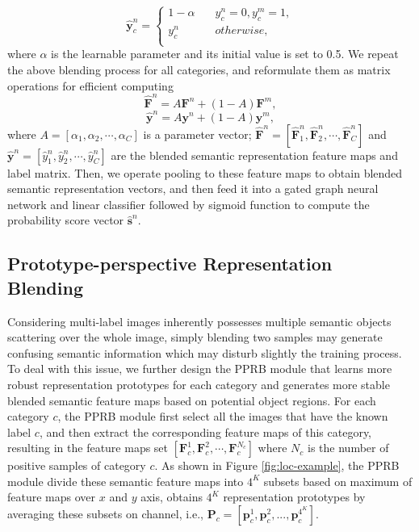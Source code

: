 \documentclass[lettersize,journal]{IEEEtran}
\begin{document}
\begin{equation}
 \hat{\textbf{y}}^{n}_c=
  \begin{cases}
   1 - \alpha \quad & y^n_c=0, y^m_c=1, \\
   y^{n}_c \quad & otherwise,\\
  \end{cases}
\end{equation}
where $\alpha$ is the learnable parameter and its initial value is set to 0.5. We repeat the above blending process for all categories, and reformulate them as matrix operations for efficient computing 
\begin{equation}
 {\hat{\textbf{F}}^{n}} = A \textbf{F}^{n} + (1-A) \textbf{F}^{m},
 \end{equation}
\begin{equation}
 {\hat{\textbf{y}}^{n}} = A \textbf{y}^n + (1-A) \textbf{y}^m,
\end{equation}
where $A=[\alpha_1, \alpha_2, \cdots, \alpha_C]$ is a parameter vector; $\hat{\textbf{F}}^{n}=[\hat{\textbf{F}}^{n}_1, \hat{\textbf{F}}^{n}_2, \cdots, \hat{\textbf{F}}^{n}_C]$ and $\hat{\textbf{y}}^{n}=[\hat{y}^{n}_1, \hat{y}^{n}_2, \cdots, \hat{y}^{n}_C]$ are the blended semantic representation feature maps and label matrix. Then, we operate pooling to these feature maps to obtain blended semantic representation vectors, and then feed it into a gated graph neural network and linear classifier followed by sigmoid function to compute the probability score vector $\hat{\textbf{s}}^{n}$.

\subsection{Prototype-perspective Representation Blending}
Considering multi-label images inherently possesses multiple semantic objects scattering over the whole image, simply blending two samples may generate confusing semantic information which may disturb slightly the training process. To deal with this issue, we further design the PPRB module that learns more robust representation prototypes for each category and generates more stable blended semantic feature maps based on potential object regions. For each category $c$, the PPRB module first select all the images that have the known label $c$, and then extract the corresponding feature maps of this category, resulting in the feature maps set $[\textbf{F}^{1}_c, \textbf{F}^{2}_c, \cdots, \textbf{F}^{N_c}_c]$ where $N_c$ is the number of positive samples of category $c$. As shown in Figure \ref{fig:loc-example}, the PPRB module divide these semantic feature maps into $4^K$ subsets based on maximum of feature maps over $x$ and $y$ axis, obtains $4^K$ representation prototypes by averaging these subsets on channel, i.e., $\textbf{P}_{c}=[\textbf{p}^1_c, \textbf{p}^2_c, ..., \textbf{p}^{4^K}_c]$.
\end{document}
